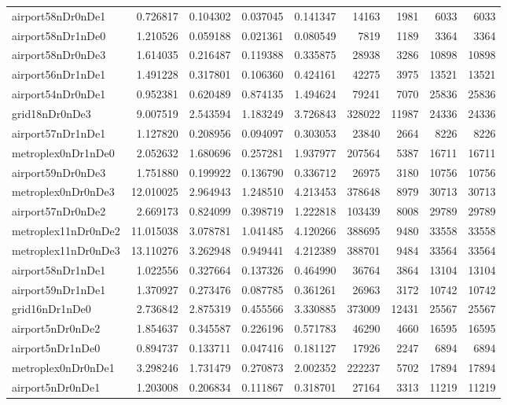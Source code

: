 \begin{longtable}{|l|r|r|r|r|r|r|r|r|}
airport58nDr0nDe1 & 0.726817 & 0.104302 & 0.037045 & 0.141347 & 14163 & 1981 & 6033 & 6033 \\
airport58nDr1nDe0 & 1.210526 & 0.059188 & 0.021361 & 0.080549 & 7819 & 1189 & 3364 & 3364 \\
airport58nDr0nDe3 & 1.614035 & 0.216487 & 0.119388 & 0.335875 & 28938 & 3286 & 10898 & 10898 \\
airport56nDr1nDe1 & 1.491228 & 0.317801 & 0.106360 & 0.424161 & 42275 & 3975 & 13521 & 13521 \\
airport54nDr0nDe1 & 0.952381 & 0.620489 & 0.874135 & 1.494624 & 79241 & 7070 & 25836 & 25836 \\
grid18nDr0nDe3 & 9.007519 & 2.543594 & 1.183249 & 3.726843 & 328022 & 11987 & 24336 & 24336 \\
airport57nDr1nDe1 & 1.127820 & 0.208956 & 0.094097 & 0.303053 & 23840 & 2664 & 8226 & 8226 \\
metroplex0nDr1nDe0 & 2.052632 & 1.680696 & 0.257281 & 1.937977 & 207564 & 5387 & 16711 & 16711 \\
airport59nDr0nDe3 & 1.751880 & 0.199922 & 0.136790 & 0.336712 & 26975 & 3180 & 10756 & 10756 \\
metroplex0nDr0nDe3 & 12.010025 & 2.964943 & 1.248510 & 4.213453 & 378648 & 8979 & 30713 & 30713 \\
airport57nDr0nDe2 & 2.669173 & 0.824099 & 0.398719 & 1.222818 & 103439 & 8008 & 29789 & 29789 \\
metroplex11nDr0nDe2 & 11.015038 & 3.078781 & 1.041485 & 4.120266 & 388695 & 9480 & 33558 & 33558 \\
metroplex11nDr0nDe3 & 13.110276 & 3.262948 & 0.949441 & 4.212389 & 388701 & 9484 & 33564 & 33564 \\
airport58nDr1nDe1 & 1.022556 & 0.327664 & 0.137326 & 0.464990 & 36764 & 3864 & 13104 & 13104 \\
airport59nDr1nDe1 & 1.370927 & 0.273476 & 0.087785 & 0.361261 & 26963 & 3172 & 10742 & 10742 \\
grid16nDr1nDe0 & 2.736842 & 2.875319 & 0.455566 & 3.330885 & 373009 & 12431 & 25567 & 25567 \\
airport5nDr0nDe2 & 1.854637 & 0.345587 & 0.226196 & 0.571783 & 46290 & 4660 & 16595 & 16595 \\
airport5nDr1nDe0 & 0.894737 & 0.133711 & 0.047416 & 0.181127 & 17926 & 2247 & 6894 & 6894 \\
metroplex0nDr0nDe1 & 3.298246 & 1.731479 & 0.270873 & 2.002352 & 222237 & 5702 & 17894 & 17894 \\
airport5nDr0nDe1 & 1.203008 & 0.206834 & 0.111867 & 0.318701 & 27164 & 3313 & 11219 & 11219 \\

\end{longtable}
